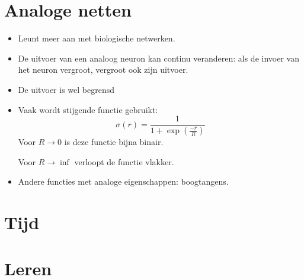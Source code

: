 \section{Analoge netten}
\begin{itemize}
    \item Leunt meer aan met biologische netwerken.
    \item De uitvoer van een analoog neuron kan continu veranderen: als de invoer van het neuron vergroot, vergroot ook zijn uitvoer.
    \item De uitvoer is wel begrensd
    \item Vaak wordt stijgende functie gebruikt:
    $$\sigma(r) = \frac{1}{1 + \exp(\frac{-r}{R})}$$
    Voor $R \rightarrow 0$ is deze functie bijna binair. 

    Voor $R \rightarrow \inf$ verloopt de functie vlakker.
    \item Andere functies met analoge eigenschappen: boogtangens.
\end{itemize}

\section{Tijd}

\section{Leren}